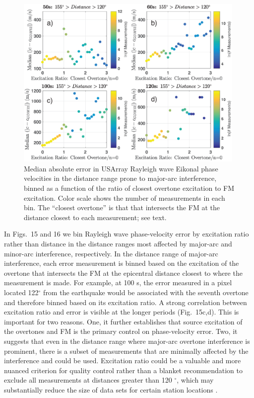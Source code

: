 \documentclass[extra,mreferee]{gji}
\begin{document}
\begin{figure}
 \includegraphics[width=0.99\textwidth]{Fig15.eps}
 \caption{Median absolute error in USArray Rayleigh wave Eikonal phase velocities in the distance range prone to major-arc interference, binned as a function of the ratio of closest overtone excitation to FM excitation. Color scale shows the number of measurements in each bin. The ``closest overtone'' is that that intersects the FM at the distance closest to each measurement; see text.}
\end{figure}

In Figs.\ 15 and 16 we bin Rayleigh wave phase-velocity error by excitation ratio rather than distance in the distance ranges most affected by major-arc and minor-arc interference, respectively. In the distance range of major-arc interference, each error measurement is binned based on the excitation of the overtone that intersects the FM at the epicentral distance closest to where the measurement is made. For example, at 100 s, the error measured in a pixel located 122$^\circ$ from the earthquake would be associated with the seventh overtone and therefore binned based on its excitation ratio. A strong correlation between excitation ratio and error is visible at the longer periods (Fig.\ 15c,d). This is important for two reasons. One, it further establishes that source excitation of the overtones and FM is the primary control on phase-velocity error. Two, it suggests that even in the distance range where major-arc overtone interference is prominent, there is a subset of measurements that are minimally affected by the interference and could be used. Excitation ratio could be a valuable and more nuanced criterion for quality control rather than a blanket recommendation to exclude all measurements at distances greater than 120 $^\circ$, which may substantially reduce the size of data sets for certain station locations \citep{hariharan2020evidence}. 
\end{document}
